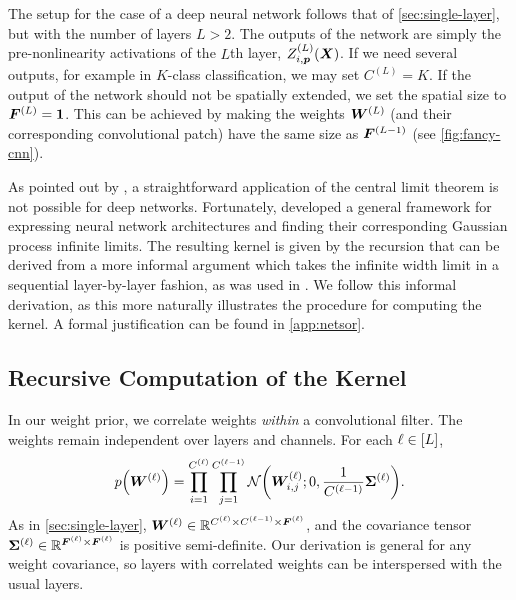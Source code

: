 \documentclass[accepted]{uai2021} %
\newcommand{\layerAs}[2]{Z^{(#1)}_{#2}(\vX)}
\newcommand{\layerC}[1]{C^{(#1)}}
\newcommand{\layerW}[1]{\mW^{(#1)}}
\newcommand{\layersizebase}{\vF}
\newcommand{\layersize}[1]{{\layersizebase^{\bra{#1}}}}
\newcommand{\priorWcovs}[1]{\Sigma^{(#1)}}
\newcommand{\priorWcov}[1]{\boldsymbol{\Sigma}^{(#1)}}
\newcommand{\chan}{i}
\newcommand{\prevchan}{j}   %
\newcommand{\patch}{\vp}               %
\newcommand{\0}{\boldsymbol{0}}
\newcommand{\1}{\boldsymbol{1}}
\begin{document}
The setup for the case of a deep neural network follows that of \cref{sec:single-layer}, but with the number of layers $L>2$. The outputs of the network are simply the pre-nonlinearity activations of the $L$th layer, $\layerAs{L}{\chan,\patch}$. If we need several outputs, for example in $K$-class classification, we may set $\layerC{L}=K.$
If the output of the network should not be spatially extended, we set the spatial size to $\layersize{L}=\1$. This can be achieved by making the weights $\layerW{L}$ (and their corresponding convolutional patch) have the same size as $\layersize{L-1}$ (see \cref{fig:fancy-cnn}).

As pointed out by \citet{matthews2018dnnlimit}, a straightforward application of the central limit theorem is not possible for deep networks. Fortunately, \citet{yang2019wide} developed a general framework for expressing neural network architectures and finding their corresponding Gaussian process infinite limits. The resulting kernel is given by the recursion that can be derived from a more informal argument which takes the infinite width limit in a sequential layer-by-layer fashion, as was used in \citet{garriga2018infiniteconv}. We follow this informal derivation, as this more naturally illustrates the procedure for computing the kernel. A formal justification can be found in \cref{app:netsor}.

\subsection{Recursive Computation of the Kernel}
In our weight prior, we correlate weights \emph{within} a convolutional filter. The weights remain independent over layers and channels. For each $\ell \in [L]$,
\begin{equation}
  p\bra{\layerW{\ell}} = \prod_{\chan=1}^{\layerC{\ell}}\prod_{\prevchan=1}^{\layerC{\ell-1}}
  \Normal{\layerW{\ell}_{\chan,\prevchan}; 0, \frac{1}{\layerC{\ell-1}} \priorWcov{\ell}}.
    \label{eq:correlated-weight-prior}
\end{equation}
As in \cref{sec:single-layer}, $\layerW{\ell} \in \sR^{\layerC{\ell}\times\layerC{\ell-1}\times\layersize{\ell}}$, and the covariance tensor $\priorWcov{\ell} \in \sR^{\layersize{\ell}\times\layersize{\ell}}$ is positive semi-definite.
Our derivation is general for any weight covariance, so layers with correlated weights can be interspersed with the usual layers.
\end{document}
